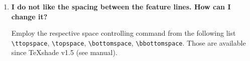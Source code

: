 \documentclass[12pt]{article}
\begin{document}
\begin{enumerate}
    The \verb|\shadebox| command simply prints a color-filled box at 
    the very location it occurs in the text. This means you have to 
    use \verb|\shadebox| in the normal text after the \TeX{}shade environment
    or inside the caption. You find a minimal example below:
    \medskip
    
    \verb|\begin{texshade}{alignmentfile.MSF}|
    \medskip
    
    \qquad \verb|\showcpation{Red box: \shadebox{Red}|
    \medskip
    
    \qquad \emph{further commands, if needed}
    \medskip
    
    \verb|\end{texshade}|
    \medskip
    
    Legend: 
    
    \qquad\verb|\shadebox{conserved}|: conserved residues 
    
    \qquad\verb|\shadebox{White}|: boring residues
    
    \qquad\verb|\shadebox{Red}|: exciting residues
    

    
    \item

    \textbf{I do not like the spacing between the feature lines. How
    can I change it?}
    
    Employ the respective space controlling command from the
    following list \verb|\ttopspace|,
    \verb|\topspace|, \verb|\bottomspace|, \verb|\bbottomspace|. 
    Those are available since \TeX{}shade v1.5 (see manual).
   
    

\end{enumerate}
    
\end{document}
